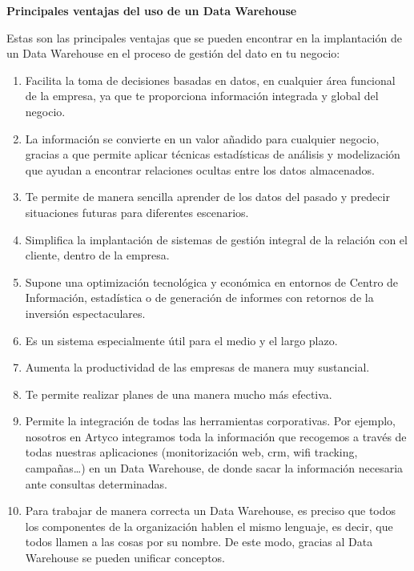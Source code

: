 \documentclass{article} %
\begin{document}
\noindent 

\noindent \textbf{Principales ventajas del uso de un Data Warehouse}

\noindent Estas son las principales ventajas que se pueden encontrar en la implantaci\'{o}n de un Data Warehouse en el proceso de gesti\'{o}n del dato en tu negocio:

\noindent 

\begin{enumerate}
\item  Facilita la toma de decisiones basadas en datos, en cualquier \'{a}rea funcional de la empresa, ya que te proporciona informaci\'{o}n integrada y global del negocio.

\item  La informaci\'{o}n se convierte en un valor a\~{n}adido para cualquier negocio, gracias a que permite aplicar t\'{e}cnicas estad\'{i}sticas de an\'{a}lisis y modelizaci\'{o}n que ayudan a encontrar relaciones ocultas entre los datos almacenados.

\item  Te permite de manera sencilla aprender de los datos del pasado y predecir situaciones futuras para diferentes escenarios.

\item  Simplifica la implantaci\'{o}n de sistemas de gesti\'{o}n integral de la relaci\'{o}n con el cliente, dentro de la empresa.

\item  Supone una optimizaci\'{o}n tecnol\'{o}gica y econ\'{o}mica en entornos de Centro de Informaci\'{o}n, estad\'{i}stica o de generaci\'{o}n de informes con retornos de la inversi\'{o}n espectaculares.

\item  Es un sistema especialmente \'{u}til para el medio y el largo plazo.

\item  Aumenta la productividad de las empresas de manera muy sustancial.

\item  Te permite realizar planes de una manera mucho m\'{a}s efectiva.

\item  Permite la integraci\'{o}n de todas las herramientas corporativas. Por ejemplo, nosotros en Artyco integramos toda la informaci\'{o}n que recogemos a trav\'{e}s de todas nuestras aplicaciones (monitorizaci\'{o}n web, crm, wifi tracking, campa\~{n}as{\dots}) en un Data Warehouse, de donde sacar la informaci\'{o}n necesaria ante consultas determinadas.

\item  Para trabajar de manera correcta un Data Warehouse, es preciso que todos los componentes de la organizaci\'{o}n hablen el mismo lenguaje, es decir, que todos llamen a las cosas por su nombre. De este modo, gracias al Data Warehouse se pueden unificar conceptos.
\end{enumerate}
\end{document}
